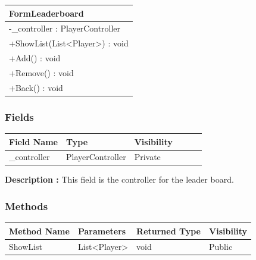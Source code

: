 \documentclass[12pt]{article}
\begin{document}
    \begin{table}[H]
        \begin{tabular}{|l|}
            \hline
            \rowcolor[HTML]{C0C0C0}
            \textbf{FormLeaderboard}                                  \\ \hline
            \rowcolor[HTML]{EFEFEF}
            -\_controller : PlayerController                          \\ \hline
            \rowcolor[HTML]{FFFFFF}
            +ShowList(List\textless{}{}Player\textgreater{}{}) : void \\ \hline
            +Add() : void                                             \\ \hline
            +Remove() : void                                          \\ \hline
            +Back() : void                                            \\ \hline
        \end{tabular}
    \end{table}

    \subsubsection{Fields}

    \begin{table}[H]
        \begin{tabular}{llllll}
            \hline
            \multicolumn{1}{|l|}{\cellcolor[HTML]{EFEFEF}\textbf{Field Name}} & \multicolumn{1}{l|}{\cellcolor[HTML]{EFEFEF}\textbf{Type}} & \multicolumn{1}{l|}{\cellcolor[HTML]{EFEFEF}\textbf{Visibility}} \\ \hline
            \multicolumn{1}{|l|}{\_controller}                                & \multicolumn{1}{l|}{PlayerController}                      & \multicolumn{1}{l|}{Private}                                     \\ \hline
        \end{tabular}
    \end{table}

    \textbf{Description :} This field is the controller for the leader board.

    \subsubsection{Methods}

    \begin{table}[H]
        \begin{tabular}{|l|l|l|l|}
            \hline
            \rowcolor[HTML]{EFEFEF}
            \cellcolor[HTML]{EFEFEF}\textbf{Method Name} & \textbf{Parameters}                 & \textbf{Returned Type} & \textbf{Visibility} \\ \hline
            ShowList                                     & List\textless{}Player\textgreater{} & void                   & Public              \\ \hline
        \end{tabular}
    \end{table}
\end{document}
